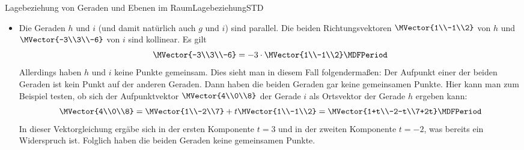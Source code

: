 \begin{MXContent}{Lagebeziehung von Geraden und Ebenen im Raum}{Lagebeziehung}{STD}
\begin{MExample}
\begin{itemize}
\item Die Geraden $h$ und $i$ (und damit natürlich auch $g$ und $i$) sind parallel. Die beiden Richtungsvektoren $\MVector{1\\-1\\2}$ von $h$ und $\MVector{-3\\3\\-6}$ von $i$ sind kollinear. Es gilt
\[
  \MVector{-3\\3\\-6}= -3\cdot\MVector{1\\-1\\2} \MDFPeriod
\]
Allerdings haben $h$ und $i$ keine Punkte gemeinsam. Dies sieht man in diesem Fall folgendermaßen: Der Aufpunkt einer der beiden Geraden ist kein Punkt auf der anderen Geraden. Dann haben die beiden Geraden gar keine gemeinsamen Punkte. Hier kann man zum Beispiel testen, ob sich der Aufpunktvektor $\MVector{4\\0\\8}$ der Gerade $i$ als Ortsvektor der Gerade $h$ ergeben kann:
\[
 \MVector{4\\0\\8}=\MVector{1\\-2\\7}+t\MVector{1\\-1\\2}=\MVector{1+t\\-2-t\\7+2t}\MDFPeriod
\]
In dieser Vektorgleichung ergäbe sich in der ersten Komponente $t=3$ und in der zweiten Komponente $t=-2$, was bereits ein Widerspruch ist. Folglich haben die beiden Geraden keine gemeinsamen Punkte.


\end{itemize}
\end{MExample}
\end{MXContent}
